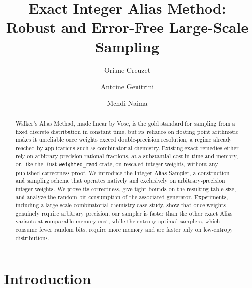 \documentclass[runningheads]{llncs}
\begin{document}
\title{Exact Integer Alias Method: Robust and Error-Free Large-Scale Sampling}


\author{Oriane Crouzet \and
Antoine Genitrini \and
Mehdi Naima}



\maketitle

\begin{abstract}
Walker's Alias Method, made linear by Vose, is the gold standard for sampling from a fixed discrete
distribution in constant time, but its reliance on floating-point arithmetic makes it unreliable once
weights exceed double-precision resolution, a regime already reached by applications such as combinatorial
chemistry. Existing exact remedies either rely on arbitrary-precision rational fractions, at a substantial
cost in time and memory, or, like the Rust \texttt{weighted\_rand} crate, on rescaled integer weights, without
any published correctness proof. We introduce the Integer-Alias Sampler, a construction and sampling scheme that
operates natively and exclusively on arbitrary-precision integer weights. We prove its correctness, give tight bounds on the resulting table size, and analyze the random-bit
consumption of the associated generator. Experiments, including a large-scale combinatorial-chemistry case
study, show that once weights genuinely require arbitrary precision, our sampler is faster than the other
exact Alias variants at comparable memory cost, while the entropy-optimal samplers, which consume fewer
random bits, require more memory and are faster only on low-entropy distributions.
\end{abstract}



\section{Introduction}
\label{sec:intro}
\end{document}
